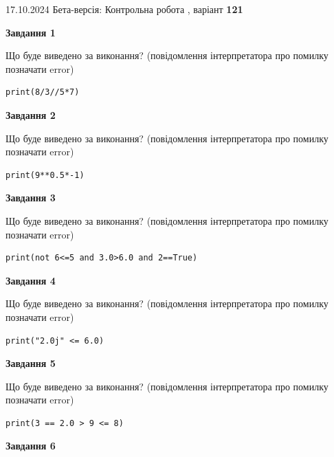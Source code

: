 \documentclass[12pt, ukrainian]{article}
\begin{document}
{\Large{17.10.2024 Бета-версія: Контрольна робота , варіант  \No \textbf { 121 }\par}}
{
\begin {large}
{\begin {center}\textbf{Завдання 1}\end {center}}

Що буде виведено за виконання? (повідомлення інтерпретатора про помилку позначати error)\par
\begin{verbatim}
print(8/3//5*7)
\end{verbatim}

{\begin {center}\textbf{Завдання 2}\end {center}}

Що буде виведено за виконання? (повідомлення інтерпретатора про помилку позначати error)\par
\begin{verbatim}
print(9**0.5*-1)
\end{verbatim}

{\begin {center}\textbf{Завдання 3}\end {center}}

Що буде виведено за виконання? (повідомлення інтерпретатора про помилку позначати error)\par
\begin{verbatim}
print(not 6<=5 and 3.0>6.0 and 2==True)
\end{verbatim}

{\begin {center}\textbf{Завдання 4}\end {center}}

Що буде виведено за виконання? (повідомлення інтерпретатора про помилку позначати error)\par
\begin{verbatim}
print("2.0j" <= 6.0)
\end{verbatim}

{\begin {center}\textbf{Завдання 5}\end {center}}

Що буде виведено за виконання? (повідомлення інтерпретатора про помилку позначати error)\par
\begin{verbatim}
print(3 == 2.0 > 9 <= 8)
\end{verbatim}

{\begin {center}\textbf{Завдання 6}\end {center}}


\end{large}}
\end{document}
